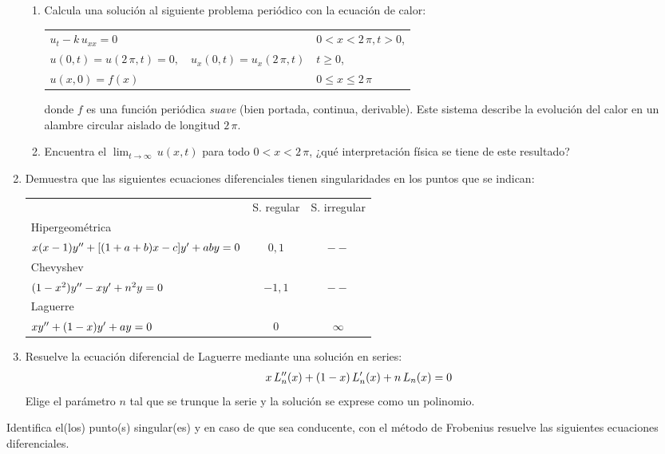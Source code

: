 \begin{enumerate}
\begin{enumerate}
\item Calcula una solución al siguiente problema periódico con la ecuación de calor:
\begin{table}[H]
\centering
\begin{tabular}{ l l}
$u_{t} - k \, u_{xx} = 0$ & $0 < x < 2 \, \pi,  t > 0$, \\
$u(0, t) = u(2 \, \pi, t) = 0, \quad u_{x} (0, t) = u_{x}(2 \, \pi, t)$ & $t \geq 0$, \\
$u(x, 0) = f(x)$ & $0 \leq x \leq 2 \, \pi$
\end{tabular}
\end{table}
donde $f$ es una función periódica \emph{suave} (bien portada, continua, derivable). Este sistema describe la evolución del calor en un alambre circular aislado de longitud $2 \, \pi$.
\item Encuentra el $\displaystyle{\lim_{t \to \infty}} \, u(x, t)$ para todo $0 < x < 2 \, \pi$, ¿qué interpretación física se tiene de este resultado?
\end{enumerate}
\item Demuestra que las siguientes ecuaciones diferenciales tienen singularidades en los puntos que se indican:
\begin{table}[H]
\centering
\begin{tabular}{l c c}
 & S. regular & S. irregular \\
Hipergeométrica & & \\
$x(x-1) {y}^{\prime \prime} + [(1 + a + b) x - c] {y}^{\prime} + a b y = 0$ & $0, 1$ & $--$ \\
Chevyshev & & \\
$(1 - x^{2}) {y}^{\prime \prime} - x {y}^{\prime} + n^{2} y = 0$ & $- 1, 1$ & $--$ \\
Laguerre & & \\
$x {y}^{\prime \prime} + (1 - x) {y}^{\prime} + a y = 0$ & $0$ & $\infty$
\end{tabular}
\end{table}
\item Resuelve la ecuación diferencial de Laguerre mediante una solución en series:
\begin{align*}
x \, {L}^{\prime \prime}_{n} (x) + (1 - x) \, {L}^{\prime}_{n} (x) + n \, L_{n} (x) = 0
\end{align*}
Elige el parámetro $n$ tal que se trunque la serie y la solución se exprese como un polinomio.
\end{enumerate}
Identifica el(los) punto(s) singular(es) y en caso de que sea conducente, con el método de Frobenius resuelve las siguientes ecuaciones diferenciales.
